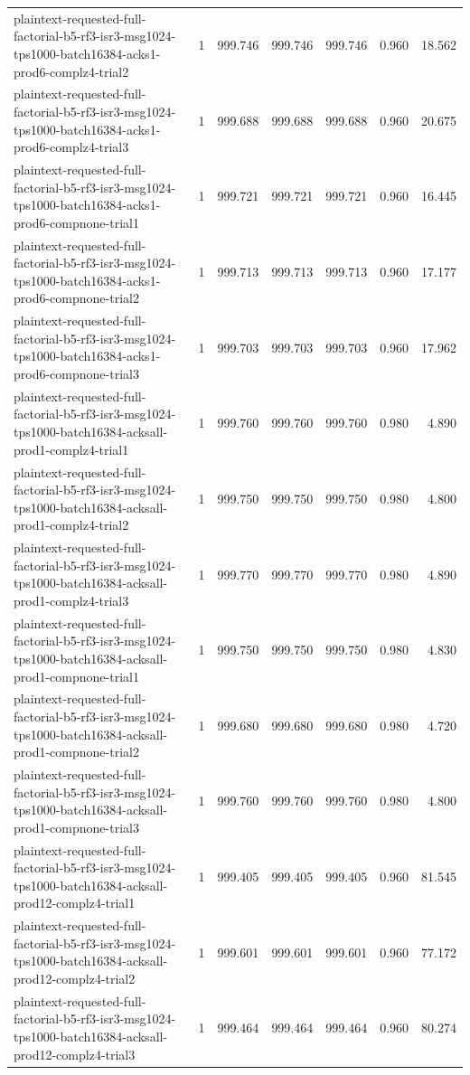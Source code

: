 \begin{tabular}{lrrrrrr}
plaintext-requested-full-factorial-b5-rf3-isr3-msg1024-tps1000-batch16384-acks1-prod6-complz4-trial2 & 1 & 999.746 & 999.746 & 999.746 & 0.960 & 18.562 \\
plaintext-requested-full-factorial-b5-rf3-isr3-msg1024-tps1000-batch16384-acks1-prod6-complz4-trial3 & 1 & 999.688 & 999.688 & 999.688 & 0.960 & 20.675 \\
plaintext-requested-full-factorial-b5-rf3-isr3-msg1024-tps1000-batch16384-acks1-prod6-compnone-trial1 & 1 & 999.721 & 999.721 & 999.721 & 0.960 & 16.445 \\
plaintext-requested-full-factorial-b5-rf3-isr3-msg1024-tps1000-batch16384-acks1-prod6-compnone-trial2 & 1 & 999.713 & 999.713 & 999.713 & 0.960 & 17.177 \\
plaintext-requested-full-factorial-b5-rf3-isr3-msg1024-tps1000-batch16384-acks1-prod6-compnone-trial3 & 1 & 999.703 & 999.703 & 999.703 & 0.960 & 17.962 \\
plaintext-requested-full-factorial-b5-rf3-isr3-msg1024-tps1000-batch16384-acksall-prod1-complz4-trial1 & 1 & 999.760 & 999.760 & 999.760 & 0.980 & 4.890 \\
plaintext-requested-full-factorial-b5-rf3-isr3-msg1024-tps1000-batch16384-acksall-prod1-complz4-trial2 & 1 & 999.750 & 999.750 & 999.750 & 0.980 & 4.800 \\
plaintext-requested-full-factorial-b5-rf3-isr3-msg1024-tps1000-batch16384-acksall-prod1-complz4-trial3 & 1 & 999.770 & 999.770 & 999.770 & 0.980 & 4.890 \\
plaintext-requested-full-factorial-b5-rf3-isr3-msg1024-tps1000-batch16384-acksall-prod1-compnone-trial1 & 1 & 999.750 & 999.750 & 999.750 & 0.980 & 4.830 \\
plaintext-requested-full-factorial-b5-rf3-isr3-msg1024-tps1000-batch16384-acksall-prod1-compnone-trial2 & 1 & 999.680 & 999.680 & 999.680 & 0.980 & 4.720 \\
plaintext-requested-full-factorial-b5-rf3-isr3-msg1024-tps1000-batch16384-acksall-prod1-compnone-trial3 & 1 & 999.760 & 999.760 & 999.760 & 0.980 & 4.800 \\
plaintext-requested-full-factorial-b5-rf3-isr3-msg1024-tps1000-batch16384-acksall-prod12-complz4-trial1 & 1 & 999.405 & 999.405 & 999.405 & 0.960 & 81.545 \\
plaintext-requested-full-factorial-b5-rf3-isr3-msg1024-tps1000-batch16384-acksall-prod12-complz4-trial2 & 1 & 999.601 & 999.601 & 999.601 & 0.960 & 77.172 \\
plaintext-requested-full-factorial-b5-rf3-isr3-msg1024-tps1000-batch16384-acksall-prod12-complz4-trial3 & 1 & 999.464 & 999.464 & 999.464 & 0.960 & 80.274 \\

\end{tabular}
